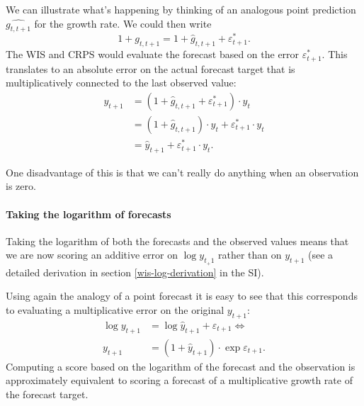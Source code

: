 \documentclass{article}
\begin{document}
We can illustrate what's happening by thinking of an analogous point prediction $\hat{g_{t, t+1}}$ for the growth rate. We could then write
\begin{equation}
    1 + g_{t, t+1} = 1 + \hat{g}_{t, t+1} + \varepsilon^*_{t+1}. 
\end{equation}
%
The WIS and CRPS would evaluate the forecast based on the error $\varepsilon^*_{t+1}$. This translates to an absolute error on the actual forecast target that is multiplicatively connected to the last observed value: 
\begin{align}
    y_{t+1} &= (1 + \hat{g}_{t, t+1} + \varepsilon^*_{t+1}) \cdot y_t \\
            &= (1 + \hat{g}_{t, t+1}) \cdot y_t + \varepsilon^*_{t+1} \cdot y_t \\
            &= \hat{y}_{t+1} + \varepsilon^*_{t+1} \cdot y_t.
\end{align}

One disadvantage of this is that we can't really do anything when an observation is zero. 

\paragraph{Taking the logarithm of forecasts}
Taking the logarithm of both the forecasts and the observed values means that we are now scoring an additive error on $\log y_{t_+1}$ rather than on $y_{t+1}$ (see a detailed derivation in section \ref{wis-log-derivation} in the SI). 

Using again the analogy of a point forecast it is easy to see that this corresponds to evaluating a multiplicative error on the original $y_{t+1}$:
%
\begin{align}
\log y_{t+1} &= \log \hat{y}_{t+1} + \varepsilon_{t+1} \Leftrightarrow \\    
y_{t+1} &= (1 + \hat{y}_{t+1}) \cdot \exp{\varepsilon_{t+1}}.    
\end{align}
%
Computing a score based on the logarithm of the forecast and the observation is approximately equivalent to scoring a forecast of a multiplicative growth rate of the forecast target. 
\end{document}
